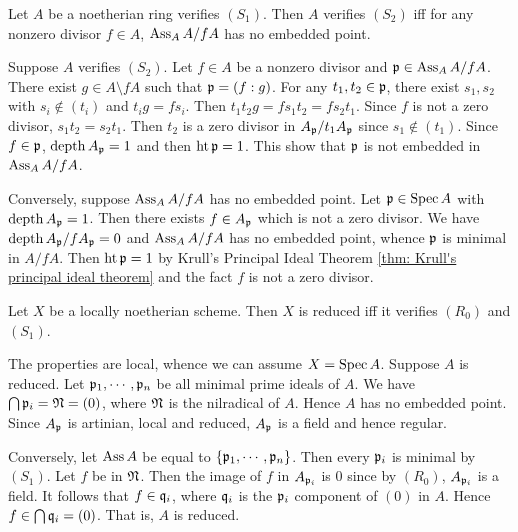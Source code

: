     \begin{example}\label{eg: S_2 is equivalent to A/fA has no embedded point}
        Let $A$ be a noetherian ring verifies $(S_1)$.
        Then $A$ verifies $(S_2)$ iff for any nonzero divisor $f \in A$, $\operatorname{Ass}_A A/fA$ has no embedded point.

        Suppose $A$ verifies $(S_2)$.
        Let $f \in A$ be a nonzero divisor and ${\mathfrak{p}} \in \operatorname{Ass}_A A/fA$.
        There exist $g \in A \setminus fA$ such that ${\mathfrak{p}} = (f:g)$.
        For any $t_1,t_2 \in {\mathfrak{p}}$, there exist $s_1,s_2$ with $s_i \notin (t_i)$ and $t_i g = f s_i$.
        Then $t_1t_2g = fs_1t_2 = fs_2t_1$.
        Since $f$ is not a zero divisor, $s_1t_2 = s_2t_1$.
        Then $t_2$ is a zero divisor in $A_{\mathfrak{p}}/t_1 A_{\mathfrak{p}}$ since $s_1 \notin (t_1)$.
        Since $f \in {\mathfrak{p}}$, $\operatorname{depth} A_{\mathfrak{p}} = 1$ and then $\operatorname{ht} {\mathfrak{p}} = 1$.
        This show that ${\mathfrak{p}}$ is not embedded in $\operatorname{Ass}_A A/fA$.
        
        Conversely, suppose $\operatorname{Ass}_A A/fA$ has no embedded point.
        Let ${\mathfrak{p}} \in \operatorname{Spec} A$ with $\operatorname{depth} A_{{\mathfrak{p}}} = 1$.
        Then there exists $f \in A_{{\mathfrak{p}}}$ which is not a zero divisor.
        We have $\operatorname{depth} A_{{\mathfrak{p}}}/fA_{\mathfrak{p}} = 0$ and $\operatorname{Ass}_A A/fA$ has no embedded point, whence ${\mathfrak{p}}$ is minimal in $A/fA$.
        Then $\operatorname{ht} {\mathfrak{p}} = 1$ by Krull's Principal Ideal Theorem \ref{thm: Krull's principal ideal theorem} and the fact $f$ is not a zero divisor.
    \end{example}

    \begin{example}\label{eg: R-S criterion of reducedness}
        Let $X$ be a locally noetherian scheme.
        Then $X$ is reduced iff it verifies $(R_0)$ and $(S_1)$.

        The properties are local, whence we can assume $X=\operatorname{Spec} A$.
        Suppose $A$ is reduced.
        Let ${\mathfrak{p}}_1,\cdots,{\mathfrak{p}}_n$ be all minimal prime ideals of $A$.
        We have $\bigcap {\mathfrak{p}}_i = {\mathfrak{N}} = (0)$, where ${\mathfrak{N}}$ is the nilradical of $A$.
        Hence $A$ has no embedded point.
        Since $A_{\mathfrak{p}}$ is artinian, local and reduced, $A_{\mathfrak{p}}$ is a field and hence regular.
        
        Conversely, let $\operatorname{Ass} A$ be equal to $\{{\mathfrak{p}}_1,\cdots,{\mathfrak{p}}_n\}$.
        Then every ${\mathfrak{p}}_i$ is minimal by $(S_1)$.
        Let $f$ be in ${\mathfrak{N}}$.
        Then the image of $f$ in $A_{{\mathfrak{p}}_i}$ is $0$ since by $(R_0)$, $A_{{\mathfrak{p}}_i}$ is a field.
        It follows that $f \in {\mathfrak{q}}_i$, where ${\mathfrak{q}}_i$ is the ${\mathfrak{p}}_i$ component of $(0)$ in $A$.
        Hence $f \in \bigcap {\mathfrak{q}}_i = (0)$.
        That is, $A$ is reduced.
    \end{example}




